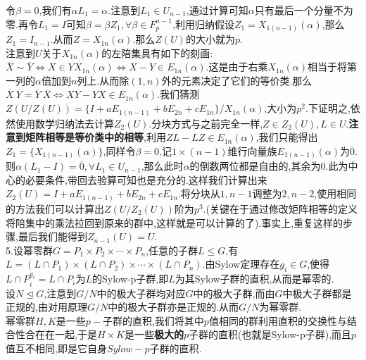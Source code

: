 \documentclass[b5paper,twoside]{ctexart}
\begin{document}
令$\beta=0$,我们有$\alpha L_1=\alpha$.注意到$L_1\in U_{n-1}$,通过计算可知$\alpha$只有最后一个分量不为零.再令$L_1=I$可知$\beta=\beta Z_1,\forall \beta\in F_p^{n-1}$,利用归纳假设$Z_1=X_{1(n-1)}(\alpha)$,那么$Z_1=I_{n-1}$.从而$Z=X_{1n}(\alpha)$.那么$Z(U)$的大小就为$p$.\\
注意到$U$关于$X_{1n}(\alpha)$的左陪集具有如下的刻画:$\overline{X}\sim \overline{Y}\Leftrightarrow X\in YX_{1n}(\alpha)\Leftrightarrow X-Y\in E_{1n}(\alpha)$.这是由于右乘$X_{1n}(\alpha)$相当于将第一列的$\alpha$倍加到$n$列上.从而除$(1,n)$外的元素决定了它们的等价类.那么$\overline{X}~\overline{Y}=\overline{Y}~\overline{X}\Leftrightarrow XY-YX\in E_{1n}(\alpha)$.我们猜测$Z(U/Z(U))=\{I+aE_{1(n-1)}+bE_{2n}+cE_{1n}\}/X_{1n}(\alpha)$,大小为$p^2$.下证明之,依然使用数学归纳法去计算$Z_2(U)$.分块方式与之前完全一样,$Z\in Z_2(U),L\in U$.\textbf{注意到矩阵相等是等价类中的相等},利用$ZL-LZ\in E_{1n}(\alpha)$,我们只能得出$Z_1=\{X_{1(n-1)}(\alpha)\}$,同样令$\beta=0$,记$1\times (n-1)$维行向量族$E_{1(n-1)}(\alpha)$为$\overline{0}$.则$\alpha(L_1-I)=\overline{0},\forall L_1\in U_{n-1}$,那么此时$\alpha$的倒数两位都是自由的,其余为0.此为中心的必要条件,带回去验算可知也是充分的.这样我们计算出来$Z_2(U)=I+aE_{1(n-1)}+bE_{2n}+cE_{1n}$.将分块从$1,n-1$调整为$2,n-2$,使用相同的方法我们可以计算出$Z(U/Z_2(U))$阶为$p^3$.(关键在于通过修改矩阵相等的定义将陪集中的乘法拉回到原来的群中,这样就是可以计算的了).事实上,重复这样的步骤,最后我们能得到$Z_{n-1}(U)=U$.\\
5.设幂零群$G=P_1\times P_2\times \cdots \times P_n$,任意的子群$L\leq G$,有$L=(L\cap P_1)\times (L\cap P_2)\times \cdots\times (L\cap P_n)$.由Sylow定理存在$g_i\in G$,使得$L\cap P_i^{g_i}=L\cap P_i$为$L$的Sylow-p子群,即$L$为其Sylow子群的直积,从而是幂零的.\\
设$N\unlhd G$,注意到$G/N$中的极大子群均对应$G$中的极大子群,而由$G$中极大子群都是正规的,由对用原理$G/N$中的极大子群亦是正规的.从而$G/N$为幂零群.\\
幂零群$H,K$是一些$p-$子群的直积,我们将其中$p$值相同的群利用直积的交换性与结合性合在在一起,于是$H\times K$是一些\textbf{极大的}$p$子群的直积(也就是Sylow-p子群),而且$p$值互不相同,即是它自身$Sylow-p$子群的直积.\\
\end{document}
